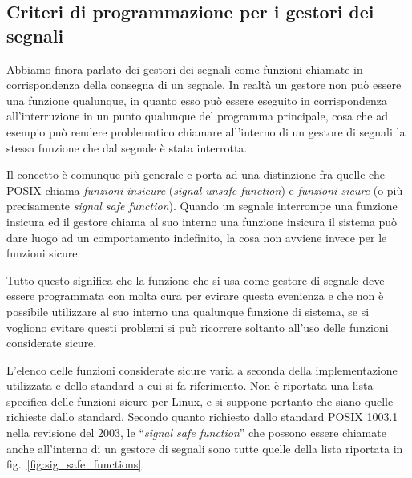 

\subsection{Criteri di programmazione per i gestori dei segnali}
\label{sec:sig_signal_handler}

Abbiamo finora parlato dei gestori dei segnali come funzioni chiamate in
corrispondenza della consegna di un segnale. In realtà un gestore non può
essere una funzione qualunque, in quanto esso può essere eseguito in
corrispondenza all'interruzione in un punto qualunque del programma
principale, cosa che ad esempio può rendere problematico chiamare all'interno
di un gestore di segnali la stessa funzione che dal segnale è stata
interrotta.


Il concetto è comunque più generale e porta ad una distinzione fra quelle che
POSIX chiama \textsl{funzioni insicure} (\textit{signal unsafe function}) e
\textsl{funzioni sicure} (o più precisamente \textit{signal safe function}).
Quando un segnale interrompe una funzione insicura ed il gestore chiama al suo
interno una funzione insicura il sistema può dare luogo ad un comportamento
indefinito, la cosa non avviene invece per le funzioni sicure.

Tutto questo significa che la funzione che si usa come gestore di segnale deve
essere programmata con molta cura per evirare questa evenienza e che non è
possibile utilizzare al suo interno una qualunque funzione di sistema, se si
vogliono evitare questi problemi si può ricorrere soltanto all'uso delle
funzioni considerate sicure.

L'elenco delle funzioni considerate sicure varia a seconda della
implementazione utilizzata e dello standard a cui si fa riferimento. Non è
riportata una lista specifica delle funzioni sicure per Linux, e si suppone
pertanto che siano quelle richieste dallo standard. Secondo quanto richiesto
dallo standard POSIX 1003.1 nella revisione del 2003, le ``\textit{signal safe
  function}'' che possono essere chiamate anche all'interno di un gestore di
segnali sono tutte quelle della lista riportata in
fig.~\ref{fig:sig_safe_functions}.

